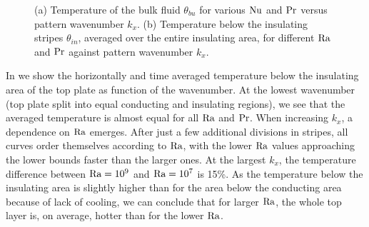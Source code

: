 \begin{figure}
\centering
{}
{}
\caption{(a) Temperature of the bulk fluid $\theta_{bu}$
for various $\text{Nu}$ and $\text{Pr}$ versus pattern wavenumber $k_x$. (b)
Temperature below the insulating stripes $\theta_{in}$, averaged over the
entire insulating area, for different $\text{Ra}$ and $\text{Pr}$ against pattern
wavenumber $k_x$.}
\label{figure4}
\end{figure}%

In  we show the horizontally and time averaged
temperature below the insulating area of the top plate as function of the
wavenumber.  At the lowest wavenumber (top plate split into equal conducting
and insulating regions), we see that the averaged temperature is almost equal
for all $\text{Ra}$ and $\text{Pr}$.  When increasing $k_x$, a dependence on $\text{Ra}$
emerges.  After just a few additional divisions in stripes, all curves order
themselves according to $\text{Ra}$, with the lower $\text{Ra}$ values approaching the
lower bounds faster than the larger ones.  At the largest $k_x$, the
temperature difference between $\text{Ra} =10^9$ and $\text{Ra}=10^7$ is 15\%.  As the
temperature below the insulating area is slightly higher than for the area
below the conducting area because of lack of cooling, we can conclude that for
larger $\text{Ra}$, the whole top layer is, on average, hotter than for the lower
$\text{Ra}$.

